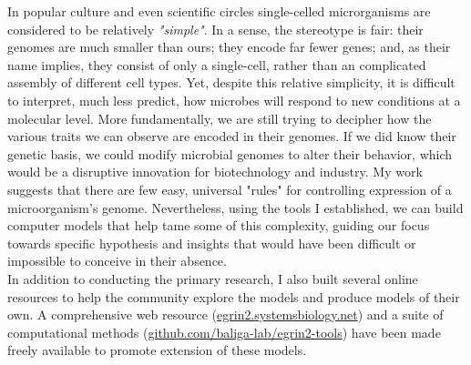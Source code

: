 \documentclass[paper=letter, fontsize=12pt]{article}
\begin{document}
In popular culture and even scientific circles single-celled microrganisms are considered to be relatively \textit{"simple"}. In a sense, the stereotype is fair: their genomes are much smaller than ours; they encode far fewer genes; and, as their name implies, they consist of only a single-cell, rather than an complicated assembly of different cell types.  Yet, despite this relative simplicity, it is difficult to interpret, much less predict, how microbes will respond to new conditions at a molecular level. More fundamentally, we are still trying to decipher how the various traits we can observe are encoded in their genomes. If we did know their genetic basis, we could modify microbial genomes to alter their behavior, which would be a disruptive innovation for biotechnology and industry. My work suggests that there are few easy, universal "rules" for controlling expression of a microorganism's genome. Nevertheless, using the tools I established, we can build computer models that help tame some of this complexity, guiding our focus towards specific hypothesis and insights that would have been difficult or impossible to conceive in their absence.\\ 

\noindent In addition to conducting the primary research, I also built several online resources to help the community explore the models and produce models of their own. A comprehensive web resource (\href{http://egrin2.systemsbiology.net}{egrin2.systemsbiology.net}) and a suite of computational methods (\href{http://nbviewer.ipython.org/github/baliga-lab/egrin2-tools/blob/master/doc/index.ipynb}{github.com/baliga-lab/egrin2-tools}) have been made freely available to promote extension of these models.\\[1mm]


\end{document}
